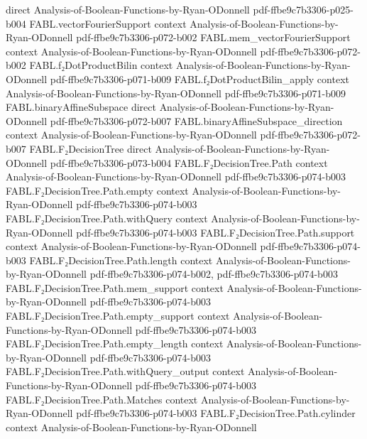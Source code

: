 \begin{theorem}
  {direct}
  {Analysis-of-Boolean-Functions-by-Ryan-ODonnell}
  {pdf-ffbe9c7b3306-p025-b004}
\proofstep
  {FABL.vectorFourierSupport}
  {context}
  {Analysis-of-Boolean-Functions-by-Ryan-ODonnell}
  {pdf-ffbe9c7b3306-p072-b002}
\proofstep
  {FABL.mem_vectorFourierSupport}
  {context}
  {Analysis-of-Boolean-Functions-by-Ryan-ODonnell}
  {pdf-ffbe9c7b3306-p072-b002}
\proofstep
  {FABL.f₂DotProductBilin}
  {context}
  {Analysis-of-Boolean-Functions-by-Ryan-ODonnell}
  {pdf-ffbe9c7b3306-p071-b009}
\proofstep
  {FABL.f₂DotProductBilin_apply}
  {context}
  {Analysis-of-Boolean-Functions-by-Ryan-ODonnell}
  {pdf-ffbe9c7b3306-p071-b009}
\proofstep
  {FABL.binaryAffineSubspace}
  {direct}
  {Analysis-of-Boolean-Functions-by-Ryan-ODonnell}
  {pdf-ffbe9c7b3306-p072-b007}
\proofstep
  {FABL.binaryAffineSubspace_direction}
  {context}
  {Analysis-of-Boolean-Functions-by-Ryan-ODonnell}
  {pdf-ffbe9c7b3306-p072-b007}
\proofstep
  {FABL.F₂DecisionTree}
  {direct}
  {Analysis-of-Boolean-Functions-by-Ryan-ODonnell}
  {pdf-ffbe9c7b3306-p073-b004}
\proofstep
  {FABL.F₂DecisionTree.Path}
  {context}
  {Analysis-of-Boolean-Functions-by-Ryan-ODonnell}
  {pdf-ffbe9c7b3306-p074-b003}
\proofstep
  {FABL.F₂DecisionTree.Path.empty}
  {context}
  {Analysis-of-Boolean-Functions-by-Ryan-ODonnell}
  {pdf-ffbe9c7b3306-p074-b003}
\proofstep
  {FABL.F₂DecisionTree.Path.withQuery}
  {context}
  {Analysis-of-Boolean-Functions-by-Ryan-ODonnell}
  {pdf-ffbe9c7b3306-p074-b003}
\proofstep
  {FABL.F₂DecisionTree.Path.support}
  {context}
  {Analysis-of-Boolean-Functions-by-Ryan-ODonnell}
  {pdf-ffbe9c7b3306-p074-b003}
\proofstep
  {FABL.F₂DecisionTree.Path.length}
  {context}
  {Analysis-of-Boolean-Functions-by-Ryan-ODonnell}
  {pdf-ffbe9c7b3306-p074-b002,
    pdf-ffbe9c7b3306-p074-b003}
\proofstep
  {FABL.F₂DecisionTree.Path.mem_support}
  {context}
  {Analysis-of-Boolean-Functions-by-Ryan-ODonnell}
  {pdf-ffbe9c7b3306-p074-b003}
\proofstep
  {FABL.F₂DecisionTree.Path.empty_support}
  {context}
  {Analysis-of-Boolean-Functions-by-Ryan-ODonnell}
  {pdf-ffbe9c7b3306-p074-b003}
\proofstep
  {FABL.F₂DecisionTree.Path.empty_length}
  {context}
  {Analysis-of-Boolean-Functions-by-Ryan-ODonnell}
  {pdf-ffbe9c7b3306-p074-b003}
\proofstep
  {FABL.F₂DecisionTree.Path.withQuery_output}
  {context}
  {Analysis-of-Boolean-Functions-by-Ryan-ODonnell}
  {pdf-ffbe9c7b3306-p074-b003}
\proofstep
  {FABL.F₂DecisionTree.Path.Matches}
  {context}
  {Analysis-of-Boolean-Functions-by-Ryan-ODonnell}
  {pdf-ffbe9c7b3306-p074-b003}
\proofstep
  {FABL.F₂DecisionTree.Path.cylinder}
  {context}
  {Analysis-of-Boolean-Functions-by-Ryan-ODonnell}

\end{theorem}
